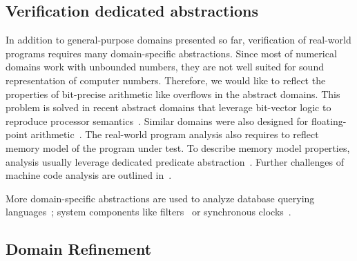 \subsection{Verification dedicated abstractions}

In addition to general-purpose domains presented so far, verification of
real-world programs requires many domain-specific abstractions. Since most of
numerical domains work with unbounded numbers, they are not well suited for
sound representation of computer numbers. Therefore, we would like to reflect
the properties of bit-precise arithmetic like overflows in the abstract
domains.  This problem is solved in recent abstract domains that leverage
bit-vector logic to reproduce processor semantics~\cite{Sharma2013,
Sharma2017}. Similar domains were also designed for floating-point
arithmetic~\cite{Putot2004}.  The real-world program analysis also requires to
reflect memory model of the program under test. To describe memory model
properties, analysis usually leverage dedicated predicate
abstraction~\cite{Dan2013}. Further challenges of machine code analysis are
outlined in~\cite{Reps2010}.

More domain-specific abstractions are used to analyze database querying
languages~\cite{Halder2012}; system components like filters~\cite{Feret2004} or
syn\-chro\-nous clocks~\cite{Feret2005}.

\subsection{Domain Refinement}
\label{sec:domainrefinement}

